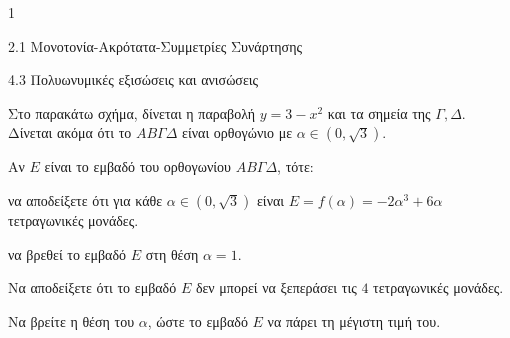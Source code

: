 \begin{ylh}{1}
\item 2.1 Μονοτονία-Ακρότατα-Συμμετρίες Συνάρτησης
\item 4.3 Πολυωνυμικές εξισώσεις και ανισώσεις
\end{ylh}
Στο παρακάτω σχήμα, δίνεται η παραβολή $y = 3 - x^2$ και τα σημεία της $\Gamma, \Delta$. Δίνεται ακόμα ότι το $AB\Gamma\Delta$ είναι ορθογώνιο με $\alpha \in (0, \sqrt{3})$.
\begin{center}
\end{center}
\begin{alist}
\item Αν $E$ είναι το εμβαδό του ορθογωνίου $AB\Gamma\Delta$, τότε:
\begin{rlist}
\item να αποδείξετε ότι για κάθε $\alpha \in (0, \sqrt{3})$ είναι $E = f(\alpha) = -2\alpha^3 + 6\alpha$ τετραγωνικές μονάδες. 
\item να βρεθεί το εμβαδό $E$ στη θέση $\alpha = 1$. 
\end{rlist}
\item Να αποδείξετε ότι το εμβαδό $E$ δεν μπορεί να ξεπεράσει τις $4$ τετραγωνικές μονάδες.
\item Να βρείτε η θέση του $\alpha$, ώστε το εμβαδό $E$ να πάρει τη μέγιστη τιμή του.
\end{alist}

